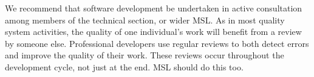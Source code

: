 We recommend that software development be undertaken in active consultation among members of the technical section, or wider MSL. As in most quality system activities, the quality of one individual's work will benefit from a review by someone else. Professional developers use regular reviews to both detect errors and improve the quality of their work. These reviews occur throughout the development cycle, not just at the end. MSL should do this too.  


